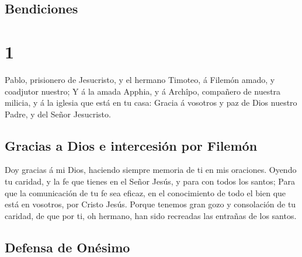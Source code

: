 \hypertarget{bendiciones}{%
\subsection{Bendiciones}\label{bendiciones}}

\hypertarget{section-57-1}{%
\section{1}\label{section-57-1}}

 Pablo, prisionero de Jesucristo, y el hermano Timoteo, á
Filemón amado, y coadjutor nuestro;  Y á la amada Apphia,
y á Archîpo, compañero de nuestra milicia, y á la iglesia que está en tu
casa:  Gracia á vosotros y paz de Dios nuestro Padre, y
del Señor Jesucristo.

\hypertarget{gracias-a-dios-e-intercesiuxf3n-por-filemuxf3n}{%
\subsection{Gracias a Dios e intercesión por
Filemón}\label{gracias-a-dios-e-intercesiuxf3n-por-filemuxf3n}}

 Doy gracias á mi Dios, haciendo siempre memoria de ti en
mis oraciones.  Oyendo tu caridad, y la fe que tienes en
el Señor Jesús, y para con todos los santos;  Para que la
comunicación de tu fe sea eficaz, en el conocimiento de todo el bien que
está en vosotros, por Cristo Jesús.  Porque tenemos gran
gozo y consolación de tu caridad, de que por ti, oh hermano, han sido
recreadas las entrañas de los santos.

\hypertarget{defensa-de-onuxe9simo}{%
\subsection{Defensa de Onésimo}\label{defensa-de-onuxe9simo}}

